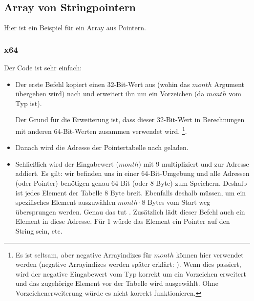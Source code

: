 \subsection{Array von Stringpointern}
\label{array_of_pointers_to_strings}
Hier ist ein Beispiel für ein Array aus Pointern.



\subsubsection{x64}



Der Code ist sehr einfach:

\begin{itemize}

\item
{}

Der erste  Befehl kopiert einen 32-Bit-Wert aus \ECX (wohin das $month$ Argument übergeben wird) nach \RAX
und erweitert ihn um ein Vorzeichen (da $month$ vom Typ \Tint ist).

Der Grund für die Erweiterung ist, dass dieser 32-Bit-Wert in Berechnungen mit anderen 64-Bit-Werten zusammen verwendet
wird.
\footnote{Es ist seltsam, aber negative Arrayindizes für $month$ können hier verwendet werden
(negative Arrayindizes werden später erklärt: ).
Wenn dies passiert, wird der negative Eingabewert vom Typ \Tint korrekt um ein Vorzeichen erweitert und das zugehörige
Element vor der Tabelle wird ausgewählt. Ohne Vorzeichenerweiterung würde es nicht korrekt funktionieren.}. 

\item
Danach wird die Adresse der Pointertabelle nach \RCX geladen.

\item
Schließlich wird der Eingabewert ($month$) mit 9 multipliziert und zur Adresse addiert.
Es gilt: wir befinden uns in einer 64-Bit-Umgebung und alle Adressen (oder Pointer) benötigen genau 64 Bit (oder 8 Byte)
zum Speichern.
Deshalb ist jedes Element der Tabelle 8 Byte breit.
Ebenfalls deshalb müssen, um ein spezifisches Element auszuwählen $month\cdot 8$ Bytes vom Start weg übersprungen
werden.
Genau das tut \MOV. Zusätzlich lädt dieser Befehl auch ein Element in diese Adresse.
Für 1 würde das Element ein Pointer auf den String  sein, etc.

\end{itemize}

